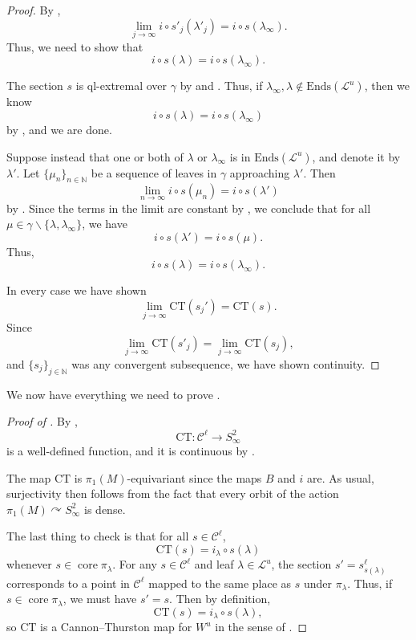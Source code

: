 \documentclass[11pt]{amsart}
\renewcommand{\l}{\lambda}
\newcommand{\mc}{\mathcal}
\newcommand{\N}{\mathbb{N}}
\newcommand\ssm{\smallsetminus}
\DeclareMathOperator{\core}{core}
\newcommand{\Ends}{\mathrm{Ends}}
\newcommand{\ct}{\mathrm{CT}}
\numberwithin{equation}{section}
\theoremstyle{definition}
\begin{document}
\begin{proof}
	
	By ,
	\[
	\lim_{j\to\infty}i\circ s'_j(\l'_j)=i\circ s(\l_\infty).
	\]
	Thus, we need to show that 
	\[
	i\circ s(\l)=i\circ s(\l_\infty).
	\]
	
	The section $s$ is ql-extremal over $\gamma$ by  and . Thus, if $\l_\infty,\l\notin\Ends(\mc L^u)$, then we know 
	\[
	i\circ s(\l)=i\circ s(\l_\infty)
	\]
	by , and we are done. 
	
	Suppose instead that one or both of $\l$ or $\l_\infty$ is in $\Ends(\mc L^u)$, and denote it by $\l'$. Let $\{\mu_n\}_{n\in\N}$ be a sequence of leaves in $\gamma$ approaching $\l'$. Then 
	\[
	\lim_{n\to\infty}i\circ s(\mu_n)=i\circ s(\l')
	\]
	by . Since the terms in the limit are constant by , we conclude that for all $\mu\in\gamma\ssm\{\l,\l_\infty\}$, we have
	\[
	i\circ s(\l')=i\circ s(\mu).
	\]
	Thus,
	\[
	i\circ s(\l)=i\circ s(\l_\infty).
	\]
	

	
 In every case we have shown
	\[
	\lim_{j\to\infty}\ct(s_j')=\ct(s).
	\]
	Since 
	\[
	\lim_{j\to\infty}\ct(s'_j)=\lim_{j\to\infty}\ct(s_j),
	\]
	and $\{s_j\}_{j\in\N}$ was any convergent subsequence, we have shown continuity.
\end{proof}

We now have everything we need to prove .

\begin{proof}[Proof of ]
	By , 
	\[
	\ct\colon\mc C^\ell\to S^2_\infty
	\] 
	is a well-defined function, and it is continuous by . 
	
	The map $\ct$ is $\pi_1(M)$-equivariant since the maps $B$ and $i$ are. As usual, surjectivity then follows from the fact that every orbit of the action $\pi_1(M)\curvearrowright S^2_\infty$ is dense. 
	
	The last thing to check is that for all $s\in\mc C^\ell$,
	\[
	\ct(s)=i_\l\circ s(\l)
	\]
	whenever $s\in\core\pi_\l$. For any $s\in\mc C^\ell$ and leaf $\l\in\mc L^u$, the section $s'=s^\ell_{s(\l)}$ corresponds to a point in $\mc C^\ell$ mapped to the same place as $s$ under $\pi_\l$. Thus, if $s\in\core\pi_\l$, we must have $s'=s$. Then by definition,
	\[
	\ct(s)=i_\l\circ s(\l),
	\]
	so $\ct$ is a Cannon--Thurston map for $W^u$ in the sense of .
\end{proof}
\end{document}
